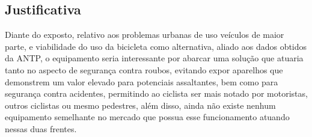 	
	\subsection{Justificativa}
	Diante do exposto, relativo aos problemas urbanas de uso veículos de maior parte, e viabilidade do uso da bicicleta como alternativa, aliado aos dados obtidos da ANTP, o equipamento seria interessante por abarcar uma solução que atuaria tanto no aspecto de segurança contra roubos, evitando expor aparelhos que demonstrem um valor elevado para potenciais assaltantes, bem como para segurança contra acidentes, permitindo ao ciclista ser mais notado por  motoristas, outros ciclistas ou mesmo pedestres, além disso, ainda não existe nenhum equipamento semelhante no mercado que possua esse funcionamento atuando nessas duas frentes. 
